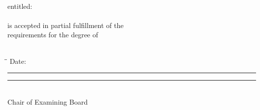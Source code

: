 {{\begin{center}
     \textbf{\@firstname~\@middlename~\underline{\@lastname}}\\
     \vfill
     entitled:\\
     \textbf{\@title}\\
     \vfill
     is accepted in partial fulfillment of the\\
     requirements for the degree of\\
     \textbf{\@degree}\\
     \vfill
     {
     \begin{singlespace}
     \begin{tabbing}
       \hspace*{0.25in}\=\hspace{3.25in}\= \kill
       \> Date: \rule{1.5in}{0.1mm} \> \rule{2.5in}{0.1mm}\\
       \> \> Chair of Examining Board \\
       \> \> \@chair

     \end{tabbing}
     \end{singlespace}
     }
     \vspace*{0.0in} %
   \end{center}
}
}

